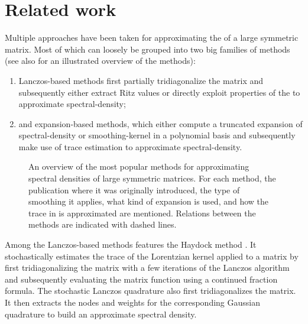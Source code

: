 
\section{Related work}
\label{sec:1-introduction-related}

Multiple approaches have been taken for approximating the 
of a large symmetric matrix. Most of which can loosely be grouped into two big families
of methods (see also  for an
illustrated overview of the methods):

\begin{enumerate}
    \item Lanczos-based methods first partially tridiagonalize the matrix and
    subsequently either extract Ritz values or directly exploit properties of the
     to approximate \gls{spectral-density};
    \item and expansion-based methods, which either compute a truncated expansion of
    \gls{spectral-density} or \gls{smoothing-kernel} in a polynomial basis and subsequently
    make use of trace estimation to approximate \gls{spectral-density}.
\end{enumerate}

\begin{figure}[ht]
    \centering
    
    \caption{An overview of the most popular methods for approximating
        spectral densities of large symmetric matrices. For each method, the publication
        where it was originally introduced, the type of smoothing it applies,
        what kind of expansion is used, and how the trace in
         is approximated
        are mentioned.
        Relations between the methods are indicated with dashed lines.}
    \label{fig:1-introduction-literature-overview}
\end{figure}

Among the Lanczos-based methods features the Haydock method \cite{haydock1972electronic, lin2016review}.
It stochastically estimates the trace of the Lorentzian kernel applied to a matrix
by first tridiagonalizing the matrix with a few iterations of the Lanczos algorithm
\cite{lanczos1950iteration} and subsequently evaluating the matrix function using
a continued fraction formula. The stochastic Lanczos quadrature \cite{lin2016review, ubaru2017lanczos,chen2021slq}
also first tridiagonalizes the matrix. It then extracts the nodes and weights
for the corresponding Gaussian quadrature to build an approximate spectral density.\\

